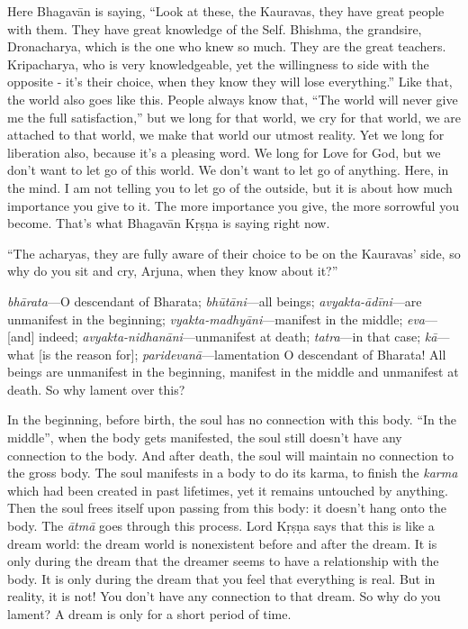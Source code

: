 Here Bhagavān is saying, “Look at these, the Kauravas, they have great people with them. They have great knowledge of the Self. Bhishma, the grandsire, Dronacharya, which is the one who knew so much. They are the great teachers. Kripacharya, who is very knowledgeable, yet the willingness to side with the opposite - it’s their choice, when they know they will lose everything.” Like that, the world also goes like this. People always know that, “The world will never give me the full satisfaction,” but we long for that world, we cry for that world, we are attached to that world, we make that world our utmost reality. Yet we long for liberation also, because it’s a pleasing word. We long for Love for God, but we don’t want to let go of this world. We don’t want to let go of anything. Here, in the mind. I am not telling you to let go of the outside, but it is about how much importance you give to it. The more importance you give, the more sorrowful you become. That’s what Bhagavān Kṛṣṇa is saying right now.

“The acharyas, they are fully aware of their choice to be on the Kauravas’ side, so why do you sit and cry, Arjuna, when they know about it?”

{%
  \textit{bhārata}---O descendant of Bharata; 
  \textit{bhūtāni}---all beings; 
  \textit{avyakta-ādīni}---are unmanifest in the beginning; 
  \textit{vyakta-madhyāni}---manifest in the middle; 
  \textit{eva}---[and] indeed; 
  \textit{avyakta-nidhanāni}---unmanifest at death; 
  \textit{tatra}---in that case; 
  \textit{kā}---what [is the reason for]; 
  \textit{paridevanā}---lamentation
}
{%
  O descendant of Bharata! All beings are unmanifest in the beginning, manifest in the middle and unmanifest at death. So why lament over this?
}

In the beginning, before birth, the soul has no connection with this body. “In the middle”, when the body gets manifested, the soul still doesn’t have any connection to the body. And after death, the soul will maintain no connection to the gross body. The soul manifests in a body to do its karma, to finish the \textit{karma} which had been created in past lifetimes, yet it remains untouched by anything. Then the soul frees itself upon passing from this body: it doesn’t hang onto the body. The \textit{ātmā} goes through this process. Lord Kṛṣṇa says that this is like a dream world: the dream world is nonexistent before and after the dream. It is only during the dream that the dreamer seems to have a relationship with the body. It is only during the dream that you feel that everything is real. But in reality, it is not! You don’t have any connection to that dream. So why do you lament? A dream is only for a short period of time.


